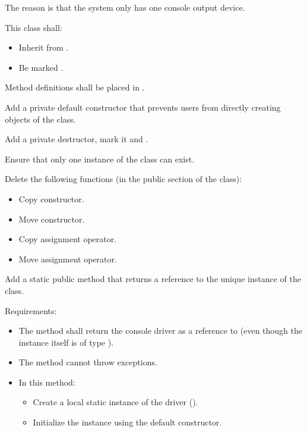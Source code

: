 The reason is that the system only has one console output device.

This class shall:
\begin{itemize}
  \item Inherit from .
  \item Be marked .
\end{itemize}
Method definitions shall be placed in .

Add a private default constructor that prevents users from directly creating objects of the class.

Add a private destructor, mark it  and .

Ensure that only one instance of the class can exist.

Delete the following functions (in the public section of the class):
\begin{itemize}
  \item Copy constructor.
  \item Move constructor.
  \item Copy assignment operator.
  \item Move assignment operator.
\end{itemize}

Add a static public method  that returns a reference to the unique instance of the
class.

Requirements:
\begin{itemize}
  \item The method shall return the console driver as a reference to
     (even though the instance itself is of type
    ).
  \item The method cannot throw exceptions.
  \item In this method:
  \begin{itemize}
    \item Create a local static instance of the driver ().
    \item Initialize the instance using the default constructor.
  \end{itemize}
\end{itemize}

